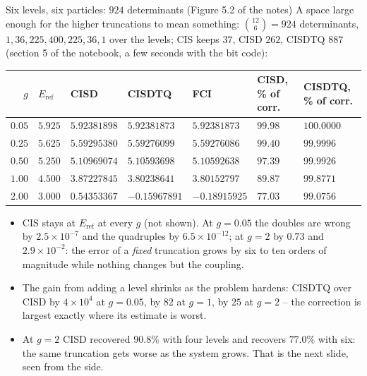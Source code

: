 \documentclass[aspectratio=169,10pt]{beamer}
\begin{document}
\begin{frame}{Six levels, six particles: $924$ determinants (Figure 5.2 of the notes)}
  \footnotesize
  A space large enough for the higher truncations to mean something: $\binom{12}{6}=924$ determinants, $1,36,225,400,225,36,1$ over the levels; CIS keeps $37$, CISD $262$, CISDTQ $887$ (section 5 of the notebook, a few seconds with the bit code):
  \begin{center}
  \renewcommand{\arraystretch}{1.15}
  \begin{tabular}{rllllll}
    \toprule
    $g$ & $E_{\mathrm{ref}}$ & CISD & CISDTQ & FCI & CISD, \% of corr. & CISDTQ, \% of corr.\\
    \midrule
    $0.05$ & $5.925$ & $5.92381898$ & $5.92381873$ & $5.92381873$ & $99.98$ & $100.0000$\\
    $0.25$ & $5.625$ & $5.59295380$ & $5.59276099$ & $5.59276086$ & $99.40$ & $99.9996$\\
    $0.50$ & $5.250$ & $5.10969074$ & $5.10593698$ & $5.10592638$ & $97.39$ & $99.9926$\\
    $1.00$ & $4.500$ & $3.87227845$ & $3.80238641$ & $3.80152797$ & $89.87$ & $99.8771$\\
    $2.00$ & $3.000$ & $0.54353367$ & $-0.15967891$ & $-0.18915925$ & $77.03$ & $99.0756$\\
    \bottomrule
  \end{tabular}
  \end{center}
  \begin{itemize}
    \item CIS stays at $E_{\mathrm{ref}}$ at every $g$ (not shown). At $g=0.05$ the doubles are wrong by $2.5\times10^{-7}$ and the quadruples by $6.5\times10^{-12}$; at $g=2$ by $0.73$ and $2.9\times10^{-2}$: the error of a \emph{fixed} truncation grows by six to ten orders of magnitude while nothing changes but the coupling.
    \item The gain from adding a level shrinks as the problem hardens: CISDTQ over CISD by $4\times10^4$ at $g=0.05$, by $82$ at $g=1$, by $25$ at $g=2$ -- the correction is largest exactly where its estimate is worst.
    \item At $g=2$ CISD recovered $90.8\%$ with four levels and recovers $77.0\%$ with six: \alert{the same truncation gets worse as the system grows}. That is the next slide, seen from the side.
  \end{itemize}
\end{frame}
\end{document}

